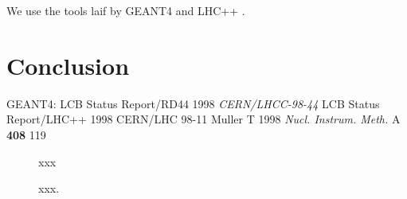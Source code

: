 \documentclass{hep99}
\begin{document}
We use the tools laif by GEANT4 and LHC++ \cite{lhc++}.
\section{Conclusion\label{sec:conclusion}}

\begin{thebibliography}{9}
 GEANT4: LCB Status Report/RD44 1998 {\it CERN/LHCC-98-44} 
 LCB Status Report/LHC++ 1998 {CERN/LHC 98-11}
 Muller T 1998 {\it Nucl. Instrum. Meth.} A {\bf 408} 119


\end{thebibliography}


\begin{figure}
\begin{center}
\end{center}
\caption{xxx}
\label{fig:uml}
\end{figure}



\begin{figure}
\begin{center}
\end{center}
\caption{xxx.}
\label{fig:finder}
\end{figure}
\end{document}
